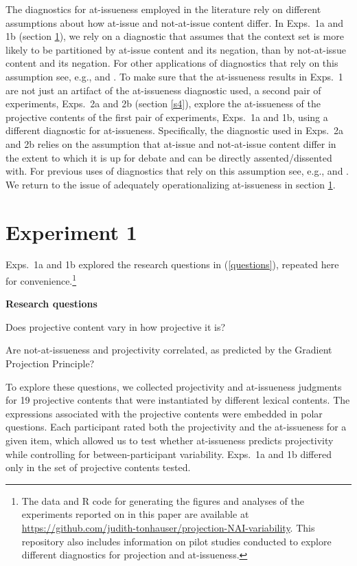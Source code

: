 \documentclass[11pt,fleqn]{article}
\newcommand{\6}{\mbox{$[\hspace*{-.6mm}[$}}
\newcommand{\9}{\mbox{$]\hspace*{-.6mm}]$}}
\begin{document}
The diagnostics for at-issueness employed in the literature rely on different assumptions about how at-issue and not-at-issue content differ. In Exps.~1a and 1b (section \ref{s3}), we rely on a diagnostic that assumes that the context set is more likely to be partitioned by at-issue content and its negation, than by not-at-issue content and its negation. For other applications of diagnostics that rely on this assumption see, e.g., \citealt{amaral-etal07} and \citealt{tonhauser-sula6}. To make sure that the at-issueness results in Exps.~1 are not just an artifact of the at-issueness diagnostic used, a second pair of experiments, Exps.~2a and 2b (section \ref{s4}), explore the at-issueness of the projective contents of the first pair of experiments, Exps.~1a and 1b, using a different diagnostic for at-issueness. Specifically, the diagnostic used in Exps.~2a and 2b relies on the assumption that at-issue and not-at-issue content differ in the extent to which it is up for debate and can be directly assented/dissented with. For previous uses of diagnostics that rely on this assumption see, e.g., \citealt{amaral-etal07,xue-onea11,murray2014,anderbois-etal2015,destruel-etal2015,tonhauser-sula6} and \citealt{syrett-koev2015}. We return to the issue of adequately operationalizing at-issueness in section \ref{s3}.

\section{Experiment 1}
\label{s3}

Exps.~1a and 1b explored the research questions in (\ref{questions}), repeated here for convenience.\footnote{\label{f-github}The
data and R code for generating the figures and analyses
of the experiments reported on in this paper are available at \url{https://github.com/judith-tonhauser/projection-NAI-variability}. This repository also includes information on pilot studies conducted to explore different diagnostics for projection and at-issueness.}

\begin{exe}
\exi{(\ref{questions})} {\bf Research questions}

\begin{xlist} 

\ex Does projective content vary in how projective it is?

Are not-at-issueness and projectivity correlated, as predicted by the Gradient Projection Principle?

\end{xlist}

\end{exe} 
To explore these questions, we collected projectivity and at-issueness judgments for 19  projective contents that were instantiated by different lexical contents. The expressions associated with the projective contents were embedded in polar questions. Each participant rated both the projectivity and the at-issueness for a given item, which allowed us to test whether at-issueness predicts projectivity while controlling for between-participant variability. Exps.~1a and 1b differed only in the set of projective contents tested. 
\end{document}
